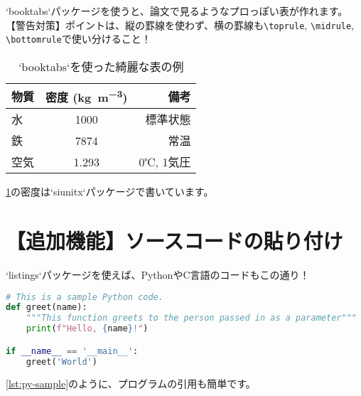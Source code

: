 \documentclass[11pt, dvipdfmx]{jsarticle}
\begin{document}
`booktabs`パッケージを使うと、論文で見るようなプロっぽい表が作れます。
【警告対策】ポイントは、縦の罫線を使わず、横の罫線も\verb|\toprule|, \verb|\midrule|, \verb|\bottomrule|で使い分けること！

\begin{table}[H]
    \centering
    \caption{`booktabs`を使った綺麗な表の例}
    \label{tab:sample-table}
    \begin{tabular}{lcr}
        \toprule
        物質 & 密度 (\si{\kilogram\per\cubic\metre}) & 備考 \\
        \midrule
        水 & \num{1000} & 標準状態 \\
        鉄 & \num{7874} & 常温 \\
        空気 & \num{1.293} & 0℃, 1気圧 \\
        \bottomrule
    \end{tabular}
\end{table}

\cref{tab:sample-table}の密度は`siunitx`パッケージで書いています。

\section{【追加機能】ソースコードの貼り付け}

`listings`パッケージを使えば、PythonやC言語のコードもこの通り！

\begin{lstlisting}[language=Python, caption={Pythonのサンプルコード}, label={lst:py-sample}]
# This is a sample Python code.
def greet(name):
    """This function greets to the person passed in as a parameter"""
    print(f"Hello, {name}!")

if __name__ == '__main__':
    greet('World')
\end{lstlisting}

\cref{lst:py-sample}のように、プログラムの引用も簡単です。
\end{document}
